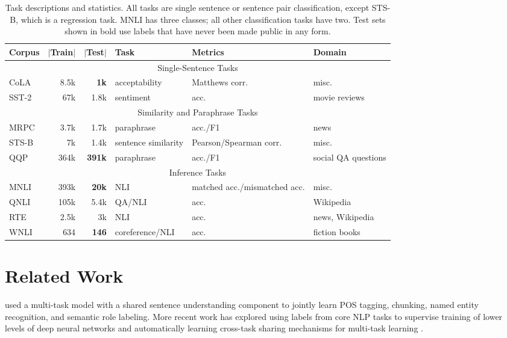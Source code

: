 \documentclass{article} \usepackage{iclr2019_conference,times}
\begin{document}
\begin{table*}[t]
\centering \small
\begin{tabular}{lrrlll}
 \toprule
\textbf{Corpus} & \textbf{$|$Train$|$} & \textbf{$|$Test$|$} & \textbf{Task} & \textbf{Metrics} & \textbf{Domain} \\
\midrule
\multicolumn{6}{c}{Single-Sentence Tasks}\\
\midrule
CoLA & 8.5k & \textbf{1k} & acceptability & Matthews corr.& misc. \\ SST-2 & 67k & 1.8k & sentiment & acc. & movie reviews \\
\midrule
\multicolumn{6}{c}{Similarity and Paraphrase Tasks}\\
\midrule
MRPC & 3.7k & 1.7k & paraphrase & acc./F1 & news \\
STS-B & 7k & 1.4k & sentence similarity & Pearson/Spearman corr. & misc. \\
QQP & 364k & \textbf{391k} & paraphrase & acc./F1 & social QA questions \\
\midrule
\multicolumn{6}{c}{Inference Tasks} \\
\midrule
MNLI & 393k & \textbf{20k} & NLI & matched acc./mismatched acc. & misc. \\
QNLI & 105k & 5.4k & QA/NLI & acc. & Wikipedia \\
RTE & 2.5k & 3k & NLI & acc. & news, Wikipedia \\
WNLI & 634 & \textbf{146} & coreference/NLI & acc. & fiction books \\
\bottomrule
\end{tabular}
\caption{Task descriptions and statistics. All tasks are single sentence or sentence pair classification, except STS-B, which is a regression task. MNLI has three classes; all other classification tasks have two. Test sets shown in bold use labels that have never been made public in any form.
}
\label{tab:tasks}
\end{table*}

\section{Related Work}
\label{sec:related}
\citet{collobert2011natural} used a multi-task model with a shared sentence understanding component to jointly learn POS tagging, chunking, named entity recognition, and semantic role labeling.
More recent work has explored using labels from core NLP tasks to supervise training of lower levels of deep neural networks \citep{sogaard2016deep,hashimoto2016joint} and 
automatically learning cross-task sharing mechanisms for multi-task learning \citep{ruder2017sluice}.
\end{document}
